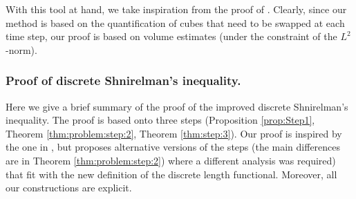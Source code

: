 \documentclass[12 pt]{article}
\theoremstyle{definition} \newtheorem{definition}{Definition}[section]
\theoremstyle{definition} \newtheorem{remark}[definition]{Remark}
\theoremstyle{plain} \newtheorem{lemma}[definition]{Lemma}
\theoremstyle{plain} \newtheorem{proposition}[definition]{Proposition}
\theoremstyle{plain} \newtheorem{theorem}[definition]{Theorem}
\theoremstyle{plain} \newtheorem{corollary}[definition]{Corollary}
\theoremstyle{definition} \newtheorem{example}[definition]{Example}
\theoremstyle{definition} \newtheorem{assumption}[definition]{Assumption}
\theoremstyle{definition} \newtheorem{conjecture}[definition]{Conjecture}
\newcommand{\1}{\mathbbm 1}
\numberwithin{equation}{section}
\begin{document}

\medskip


 With this tool at hand, we take inspiration from the proof of \cite{Shnirelman}. 
 Clearly, since our method is based on the quantification of cubes that need to be swapped at each time step, our proof is based on volume estimates (under the constraint of the $L^2$-norm). 
 
\subsubsection{Proof of discrete Shnirelman's inequality.}
 
         Here we give a brief summary of the proof of the improved discrete Shnirelman's  inequality. The proof is based onto three steps (Proposition \ref{prop:Step1}, Theorem \ref{thm:problem:step:2}, Theorem \ref{thm:step:3}). Our proof is inspired by the one in \cite{Shnirelman}, but proposes alternative versions of the steps (the main differences are in Theorem \ref{thm:problem:step:2}) where a different analysis was required) that fit with the new definition of the discrete length functional. Moreover, all our constructions are explicit.
\end{document}
